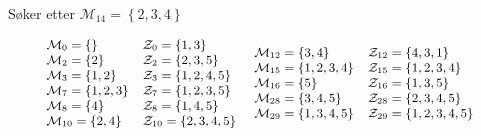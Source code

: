 \documentclass{beamer}
\begin{document}
\begin{frame}{Søker etter $\mathcal{M}_{14} = \left\{  2,3,4 \right\}$}
\begin{center}

\[
\small
    \begin{array}{ll}
        \mathcal{M}_0    = \left\{{}\right\}           & \mathcal{Z}_0    = \left\{{1,3}\right\} \\
        \mathcal{M}_2    = \left\{{2}\right\}          & \mathcal{Z}_2    = \left\{{2,3,5}\right\} \\
        \mathcal{M}_3    = \left\{{1,2}\right\}        & \mathcal{Z}_3    = \left\{{1,2,4,5}\right\} \\
        \mathcal{M}_7    = \left\{{1,2,3}\right\}      & \mathcal{Z}_7    = \left\{{1,2,3,5}\right\} \\
        \mathcal{M}_8    = \left\{{4}\right\}          & \mathcal{Z}_8    = \left\{{1,4,5}\right\} \\
        \mathcal{M}_{10} = \left\{{2,4}\right\}        & \mathcal{Z}_{10} = \left\{{2,3,4,5}\right\}
    \end{array}
~
    \begin{array}{ll}
        \mathcal{M}_{12} = \left\{{3,4}\right\}        & \mathcal{Z}_{12} = \left\{{4,3,1}\right\} \\
        \mathcal{M}_{15} = \left\{{1,2,3,4}\right\}    & \mathcal{Z}_{15} = \left\{{1,2,3,4}\right\} \\
        \mathcal{M}_{16} = \left\{{5}\right\}          & \mathcal{Z}_{16} = \left\{{1,3,5}\right\} \\
        \mathcal{M}_{28} = \left\{{3,4,5}\right\}      & \mathcal{Z}_{28} = \left\{{2,3,4,5}\right\} \\
        \mathcal{M}_{29} = \left\{{1,3,4,5}\right\}    & \mathcal{Z}_{29} = \left\{{1,2,3,4,5}\right\}
    \end{array}
\]
\end{center}
\end{frame}
\end{document}
